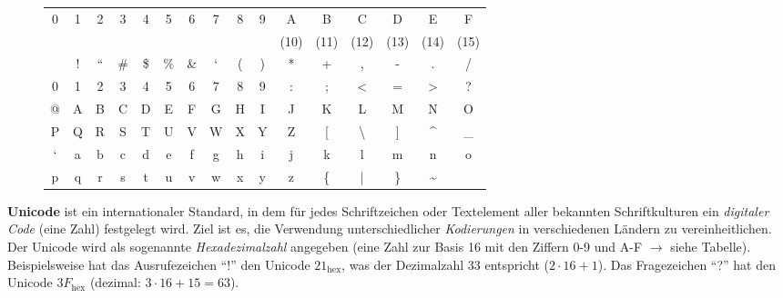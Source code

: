 \documentclass[10pt, a4paper]{arbeitsblatt}
\begin{document}
\clearpage

\begin{infobox}\begin{wrapfix}
		\begin{wrapfigure}{r}{0pt}\scriptsize
			\begin{tabular}{|*{16}{c}|}\hline
				\rowcolor{muted}
				0                  & 1 & 2                 & 3  & 4  & 5  & 6  & 7              & 8 & 9 & A    & B    & C              & D    & E               & F    \\
				\rowcolor{white}    &   &                   &    &    &    &    &                &   &   & (10) & (11) & (12)           & (13) & (14)            & (15) \\
				\rowcolor{white}    & ! & \textquotedblleft & \# & \$ & \% & \& & \textquoteleft & ( & ) & *    & +    & ,              & -    & .               & /    \\
				\rowcolor{white}  0 & 1 & 2                 & 3  & 4  & 5  & 6  & 7              & 8 & 9 & :    & ;    & <              & =    & >               & ?    \\
				\rowcolor{white}  @ & A & B                 & C  & D  & E  & F  & G              & H & I & J    & K    & L              & M    & N               & O    \\
				\rowcolor{white}  P & Q & R                 & S  & T  & U  & V  & W              & X & Y & Z    & [    & \textbackslash & ]    & \^{}            & \_   \\
				\rowcolor{white}  ` & a & b                 & c  & d  & e  & f  & g              & h & i & j    & k    & l              & m    & n               & o    \\
				\rowcolor{white}  p & q & r                 & s  & t  & u  & v  & w              & x & y & z    & \{   & |              & \}   & \textasciitilde &      \\\hline
			\end{tabular}
		\end{wrapfigure}\small
		\textbf{Unicode} ist ein internationaler Standard, in dem für jedes
		Schriftzeichen oder Textelement aller bekannten Schriftkulturen ein
		\emph{digitaler Code} (eine Zahl) festgelegt wird. Ziel ist es, die Verwendung
		unterschiedlicher \emph{Kodierungen} in verschiedenen Ländern zu
		vereinheitlichen. Der Unicode wird als sogenannte \emph{Hexadezimalzahl}
		angegeben (eine Zahl zur Basis 16 mit den Ziffern 0-9 und A-F
		$\rightarrow$ siehe Tabelle). Beispielsweise hat das Ausrufezeichen
		\enquote{!} den Unicode $21_{\text{hex}}$, was der Dezimalzahl
		$33$ entspricht ($2\cdot 16 + 1$). Das Fragezeichen
		\enquote{?} hat den Unicode $3F_{\text{hex}}$ (dezimal:
		$3\cdot 16 + 15 = 63$).
	\end{wrapfix}\end{infobox}
\end{document}
